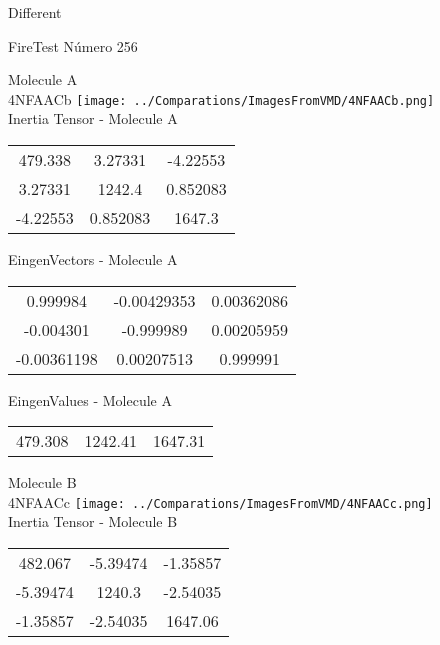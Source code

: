 \begin{center}
\vtab
\vtab
\textcolor{NavyBlue}{\Large Different}
\end{center}

 \newpage

\vtab[-2cm]
\begin{center}
{\large FireTest \tab Número 256}
\end{center}
\begin{multicols}{2}
\begin{center}

Molecule A \\ 
4NFAACb
\texttt{[image: ../Comparations/ImagesFromVMD/4NFAACb.png]}
\\
Inertia Tensor - Molecule A \\
\vtab

\begin{tabular}{|c c c|}
479.338	 & 	3.27331	 & 	-4.22553	 \\
3.27331	 & 	1242.4	 & 	0.852083	 \\
-4.22553	 & 	0.852083	 & 	1647.3
\end{tabular}

\vtab
 EingenVectors - Molecule A     \\
\vtab
\begin{tabular}{|c c c|}
0.999984	 & 	-0.00429353	 & 	0.00362086	 \\
-0.004301	 & 	-0.999989	 & 	0.00205959	 \\
-0.00361198	 & 	0.00207513	 & 	0.999991
\end{tabular}

\vtab
 EingenValues - Molecule A     \\
\vtab
\begin{tabular}{|c c c|}
479.308	 & 	1242.41	 & 	1647.31	 \\
\end{tabular}
\columnbreak

Molecule B \\ 
4NFAACc
\texttt{[image: ../Comparations/ImagesFromVMD/4NFAACc.png]}
\\
Inertia Tensor - Molecule B \\
\vtab

\begin{tabular}{|c c c|}
482.067	 & 	-5.39474	 & 	-1.35857	 \\
-5.39474	 & 	1240.3	 & 	-2.54035	 \\
-1.35857	 & 	-2.54035	 & 	1647.06
\end{tabular}


\end{center}
\end{multicols}
